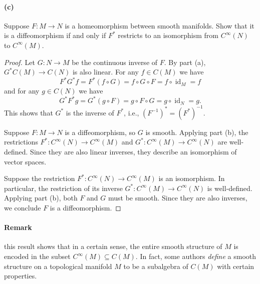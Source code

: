 \documentclass[12pt]{article}
\newlength{\myparskip}
\newenvironment{fullbox}{\begin{lrbox}{\savefullbox}\begin{minipage}{\dimexpr\textwidth-2\fboxsep\relax}\setlength{\parskip}{\myparskip}}{\end{minipage}\end{lrbox}\framebox[\textwidth]{\usebox{\savefullbox}}}
\newenvironment{pbox}[1][]{\begin{fullbox}\def\temp{#1}\ifx\temp\empty\else\paragraph{#1}\phantom{}\fi}{\end{fullbox}}
\theoremstyle{definition}
\newcommand{\<}{\langle}
\renewcommand{\>}{\rangle}
\DeclareMathOperator{\id}{id}
\begin{document}
\newpage
\begin{pbox}[(c)]
    Suppose $F: M\to N$ is a homeomorphism between smooth manifolds. Show that it is a diffeomorphism if and only if $F^*$ restricts to an isomorphism from $C^\infty(N)$ to $C^\infty(M)$.
\end{pbox}

\begin{proof}
    Let $G : N \to M$ be the continuous inverse of $F$.
    By part (a), $G^* C(M) \to C(N)$ is also linear.
    For any $f \in C(M)$ we have
    \[
        F^*G^*f
            = F^*(f \circ G)
            = f \circ G \circ F
            = f \circ \id_M
            = f
    \]
    and for any $g \in C(N)$ we have
    \[
        G^*F^*g
            = G^*(g \circ F)
            = g \circ F \circ G
            = g \circ \id_N
            = g.
    \]
    This shows that $G^*$ is the inverse of $F^*$, i.e., $(F^{-1})^* = (F^*)^{-1}$.

    Suppose $F : M \to N$ is a diffeomorphism, so $G$ is smooth.
    Applying part (b), the restrictions $F^* : C^\infty(N) \to C^\infty(M)$ and $G^* : C^\infty(M) \to C^\infty(N)$ are well-defined.
    Since they are also linear inverses, they describe an isomorphism of vector spaces.

    Suppose the restriction $F^* : C^\infty(N) \to C^\infty(M)$ is an isomorphism.
    In particular, the restriction of its inverse $G^* : C^\infty(M) \to C^\infty(N)$ is well-defined.
    Applying part (b), both $F$ and $G$ must be smooth.
    Since they are also inverses, we conclude $F$ is a diffeomorphism.
\end{proof}

\begin{pbox}[Remark]
    this result shows that in a certain sense, the entire smooth structure of $M$ is encoded in the subset $C^\infty(M) \subseteq C(M)$. In fact, some authors \textit{define} a smooth structure on a topological manifold $M$ to be a subalgebra of $C(M)$ with certain properties.
\end{pbox}
\end{document}
